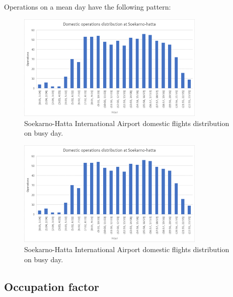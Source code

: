 Operations on a mean day have the following pattern:
\begin{figure}[H]
	\centering
	\includegraphics[clip, trim=0.1cm 0.1cm 0.1cm 0.1cm, width=0.8\textwidth]{./images/PROGNOSIS/hourDom}
	\caption{Soekarno-Hatta International Airport domestic flights distribution on busy day.}
	\label{hourDom}
\end{figure}
\begin{figure}[H]
	\centering
	\includegraphics[clip, trim=0.1cm 0.1cm 0.1cm 0.1cm, width=0.8\textwidth]{./images/PROGNOSIS/hourDom}
	\caption{Soekarno-Hatta International Airport domestic flights distribution on busy day.}
	\label{hourDom}
\end{figure}
	
	
	\subsection{Occupation factor}
	